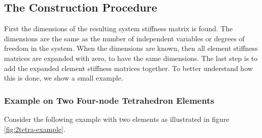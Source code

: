 


\subsection{The Construction Procedure}
First the dimensions of the resulting system stiffness matrix is
found. The dimensions are the same as the number of independent
variables or degrees of freedom in the system. When the dimensions are
known, then all element stiffness matrices are expanded with zero, to
have the same dimensions. The last step is to add the expanded
element stiffness matrices together. To better understand how this is
done, we show a small example.

\subsubsection{Example on Two Four-node Tetrahedron Elements}
\label{sec:example-of-two-tetrahedrons}
Consider the following example with two elements as illustrated in
figure \vref{fig:2tetra-example}.

